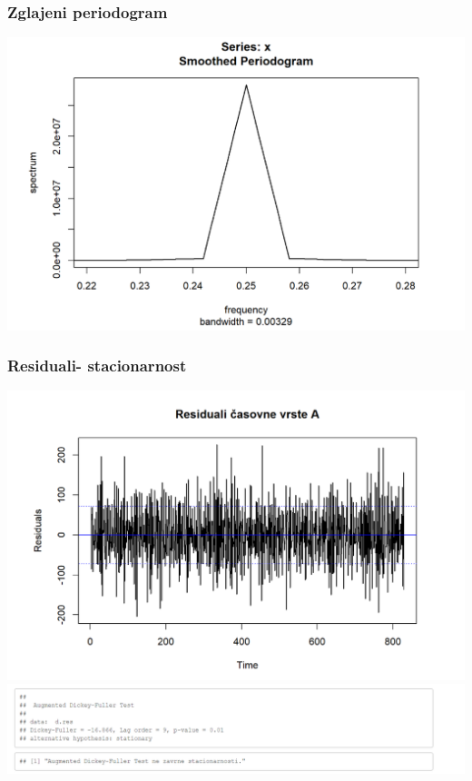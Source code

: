 \documentclass[10pt]{beamer}
\begin{document}
\begin{frame}
\frametitle{Zglajeni periodogram}
\includegraphics[width=1\textwidth]{per_raw2A.png}
\end{frame}

\begin{frame}
\frametitle{Residuali- stacionarnost}
\includegraphics[width=1\textwidth]{res_casA.png}
\includegraphics[width=1\textwidth]{DickyTestA.png}
\end{frame}
\end{document}
